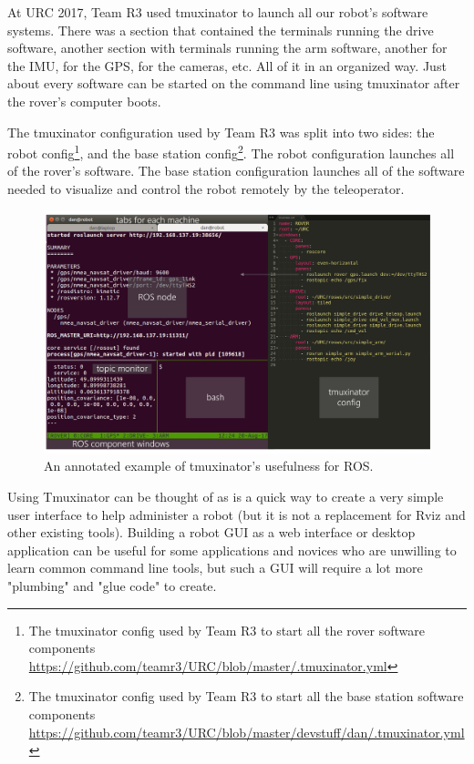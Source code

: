 \documentclass[runningheads,a4paper]{llncs}
\begin{document}
At URC 2017, Team R3 used tmuxinator to launch all our robot's software systems. There was a section that contained the terminals running the drive software, another section with terminals running the arm software, another for the IMU, for the GPS, for the cameras, etc. All of it in an organized way. Just about every software can be started on the command line using tmuxinator after the rover's computer boots.

The tmuxinator configuration used by Team R3 was split into two sides: the robot config\footnote{The tmuxinator config used by Team R3 to start all the rover software components \url{https://github.com/teamr3/URC/blob/master/.tmuxinator.yml}}, and the base station config\footnote{The tmuxinator config used by Team R3 to start all the base station software components \url{https://github.com/teamr3/URC/blob/master/devstuff/dan/.tmuxinator.yml}}. The robot configuration launches all of the rover's software. The base station configuration launches all of the software needed to visualize and control the robot remotely by the teleoperator.


\begin{figure}
\centering
\includegraphics[width=\textwidth]{tmux}
\caption{An annotated example of tmuxinator's usefulness for ROS.}
\label{fig:tmux}
\end{figure}

Using Tmuxinator can be thought of as is a quick way to create a very simple user interface to help administer a robot (but it is not a replacement for Rviz and other existing tools). Building a robot GUI as a web interface or desktop application can be useful for some applications and novices who are unwilling to learn common command line tools, but such a GUI will require a lot more "plumbing" and "glue code" to create.
\end{document}
